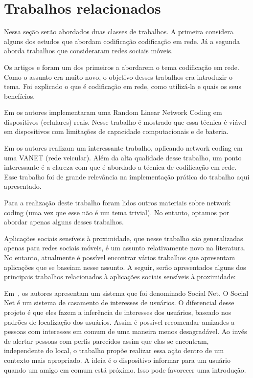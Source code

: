 \section{Trabalhos relacionados}
\label{sec:related-work}

Nessa seção serão abordados duas classes de trabalhos. A primeira
considera alguns dos estudos que abordam codificação codificação em
rede. Já a segunda aborda trabalhos que consideraram redes sociais
móveis.

Os artigos \cite{NWC_theory} e \cite{citeulike:1401816} foram um dos
primeiros a abordarem o tema codificação em rede. Como o assunto era
muito novo, o objetivo desses trabalhos era introduzir o tema. Foi
explicado o que é codificação em rede, como utilizá-la e quais os seus
benefícios.

Em \cite{pedersen09:_networ_codin_mobil_devic_system} os autores
implementaram uma Random Linear Network Coding em dispositivos
(celulares) reais. Nesse trabalho é mostrado que essa técnica é viável
em dispositivos com limitações de capacidade computacionais e de
bateria. 

Em \cite{citeulike:1401840} os autores realizam um interessante
trabalho, aplicando network coding em uma VANET (rede veicular). Além da
alta qualidade desse trabalho, um ponto interessante é a clareza com que
é abordado a técnica de codificação em rede. Esse trabalho foi de grande
relevância na implementação prática do trabalho aqui apresentado.

Para a realização deste trabalho foram lidos outros materiais sobre
network coding (uma vez que esse não é um tema trivial). No entanto,
optamos por abordar apenas alguns desses trabalhos.

Aplicações sociais sensíveis à proximidade, que nesse trabalho
são generalizadas apenas para redes sociais móveis, é um assunto
relativamente novo na literatura. No entanto, atualmente é possível
encontrar vários trabalhos que apresentam aplicações que se baseiam
nesse assunto. A seguir, serão apresentados alguns dos principais
trabalhos
relacionados à aplicações sociais sensíveis à proximidade:

Em~\cite{SocialNet}, os autores
apresentam um sistema que foi denominado Social Net. O Social Net é um
sistema de casamento de interesses de usuários. O diferencial desse
projeto é que eles fazem a inferência de interesses dos usuários,
baseado nos padrões de localização dos usuários. Assim é possível
recomendar amizades a pessoas com interesses em comum de uma maneira
menos desagradável. Ao invés de alertar pessoas com perfis parecidos
assim que elas se encontram, independente do local, o trabalho propõe
realizar essa ação dentro de um contexto mais apropriado. A ideia é o
dispositivo informar para um usuário quando um amigo em comum está
próximo. Isso pode favorecer uma introdução.

